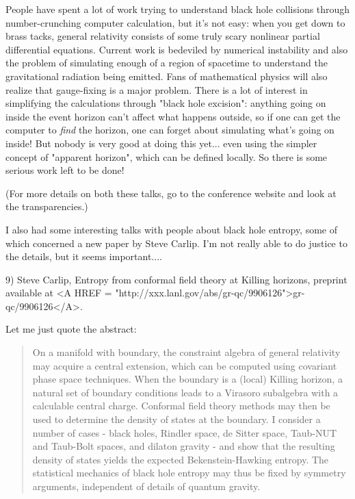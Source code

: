 People have spent a lot of work trying to understand black hole
collisions through number-crunching computer calculation, but 
it's not easy: when you get down to brass tacks, general relativity 
consists of some truly scary nonlinear partial differential equations.
Current work is bedeviled by numerical instability and also the 
problem of simulating enough of a region of spacetime to understand
the gravitational radiation being emitted.  Fans of mathematical
physics will also realize that gauge-fixing is a major problem.
There is a lot of interest in simplifying the calculations through
"black hole excision": anything going on inside the event horizon 
can't affect what happens outside, so if one can get the computer
to \emph{find} the horizon, one can forget about simulating what's going
on inside!  But nobody is very good at doing this yet... even using
the simpler concept of "apparent horizon", which can be defined
locally.  So there is some serious work left to be done! 

(For more details on both these talks, go to the conference website
and look at the transparencies.)

I also had some interesting talks with people about black hole entropy, 
some of which concerned a new paper by Steve Carlip.  I'm not really 
able to do justice to the details, but it seems important....

9) Steve Carlip, Entropy from conformal field theory at Killing 
horizons, preprint available at <A HREF = "http://xxx.lanl.gov/abs/gr-qc/9906126">gr-qc/9906126</A>.

Let me just quote the abstract:
 
\begin{quote}
     On a manifold with boundary, the constraint algebra of general 
     relativity may acquire a central extension, which can be computed 
     using covariant phase space techniques.  When the boundary is a 
     (local) Killing horizon, a natural set of boundary conditions 
     leads to a Virasoro subalgebra with a calculable central charge. 
     Conformal field theory methods may then be used to determine the
     density of states at the boundary.  I consider a number of cases -
     black holes, Rindler space, de Sitter space, Taub-NUT and Taub-Bolt 
     spaces, and dilaton gravity - and show that the resulting density 
     of states yields the expected Bekenstein-Hawking entropy.  The 
     statistical mechanics of black hole entropy may thus be fixed 
     by symmetry arguments, independent of details of quantum gravity.
\end{quote}
    
